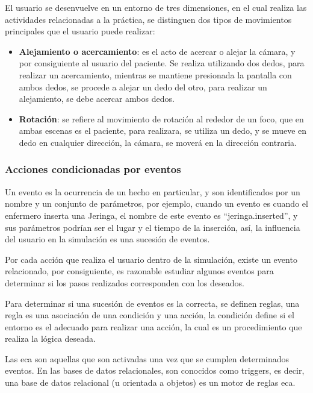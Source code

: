 El usuario se desenvuelve en un entorno de tres dimensiones, en el cual realiza las
actividades relacionadas a la práctica, se distinguen dos tipos de movimientos
principales que el usuario puede realizar:

\begin{itemize}
    \item \textbf{Alejamiento o acercamiento}: es el acto de acercar o alejar la
        cámara, y por consiguiente al usuario del paciente. Se realiza
        utilizando dos dedos, para realizar un acercamiento, mientras se
        mantiene presionada la pantalla con ambos dedos, se procede a alejar un
        dedo del otro, para realizar un alejamiento, se debe acercar ambos
        dedos.
    \item \textbf{Rotación}: se refiere al movimiento de rotación al rededor de
        un foco, que en ambas escenas es el paciente, para realizara, se utiliza
        un dedo, y se mueve en dedo en cualquier dirección, la cámara, se moverá
        en la dirección contraria.
\end{itemize}


\subsubsection{Acciones condicionadas por eventos}

Un evento es la ocurrencia de un hecho en particular, y son identificados por un
nombre y un conjunto de parámetros, por ejemplo, cuando un evento es cuando el
enfermero inserta una Jeringa, el nombre de este evento es
\enquote{jeringa.inserted}, y sus parámetros podrían ser el lugar y el tiempo de
la inserción, así, la influencia del usuario en la simulación es una sucesión de
eventos.

Por cada acción que realiza el usuario dentro de la simulación, existe un evento
relacionado, por consiguiente, es razonable estudiar algunos eventos para
determinar si los pasos realizados corresponden con los deseados. 

Para determinar si una sucesión de eventos es la correcta, se definen reglas,
una regla es una asociación de una condición y una acción, la condición define
si el entorno es el adecuado para realizar una acción, la cual es un
procedimiento que realiza la lógica deseada.

Las \gls{eca} son aquellas que son activadas una vez que se cumplen determinados
eventos\cite{bailey2004event}. En las bases de datos relacionales, son conocidos
como triggers, es decir, una base de datos relacional (u orientada a objetos) es
un motor de reglas \gls{eca}\cite{bailey2004event}\cite{behrends2006combining}.


